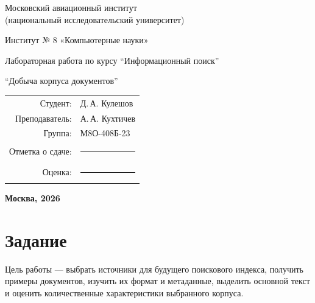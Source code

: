\documentclass[pdf,unicode,12pt,a4paper,oneside,fleqn]{article}
\begin{document}
\begin{titlepage}
\begin{center}
\bfseries

{\Large Московский авиационный институт\\
(национальный исследовательский университет)}

\vspace{48pt}

{\large Институт № 8 «Компьютерные науки»}

\vspace{72pt}

Лабораторная работа  по курсу
\enquote{Информационный поиск}

\vspace{18pt}

{\large \enquote{Добыча корпуса документов}}

\end{center}

\vspace{72pt}

\begin{flushright}
\begin{tabular}{rl}
Студент: & Д.\,А. Кулешов \\
Преподаватель: & А.\,А. Кухтичев \\
Группа: & М8О-408Б-23 \\
Отметка о сдаче: & \rule{35mm}{0.4pt} \\
Оценка: & \rule{35mm}{0.4pt} \\
\end{tabular}
\end{flushright}

\vfill

\begin{center}
\bfseries
Москва, 2026
\end{center}
\end{titlepage}

\pagebreak


\section{Задание}

Цель работы --- выбрать источники для будущего поискового индекса, получить
примеры документов, изучить их формат и метаданные, выделить основной текст и
оценить количественные характеристики выбранного корпуса.
\end{document}
